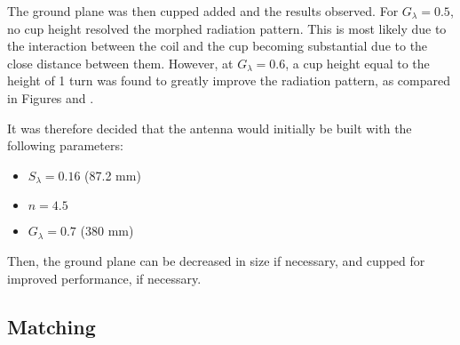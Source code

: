 The ground plane was then cupped added and the results observed. For $G_\lambda = 0.5$, no cup height resolved the morphed radiation pattern. This is most likely due to the interaction between the coil and the cup becoming substantial due to the close distance between them. However, at $G_\lambda = 0.6$, a cup height equal to the height of 1 turn was found to greatly improve the radiation pattern, as compared in Figures and .

It was therefore decided that the antenna would initially be built with the following parameters:
\begin{itemize}
    \item $S_\lambda = 0.16$ (87.2 mm)
    \item $n = 4.5$
    \item $G_\lambda = 0.7$ (380 mm)
\end{itemize}

Then, the ground plane can be decreased in size if necessary, and cupped for improved performance, if necessary.

\subsection{Matching}

